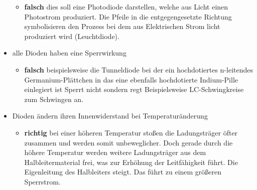 \begin{itemize}
        \begin{itemize}
            \item \textbf{falsch} dies soll eine Photodiode darstellen, welche
                aus Licht einen Photostrom produziert. 
                Die Pfeile in die entgegengesetzte Richtung symbolisieren den
                Prozess bei dem aus Elektrischen Strom licht produziert
                wird (Leuchtdiode).
        \end{itemize}
    \item alle Dioden haben eine Sperrwirkung
        \begin{itemize}
            \item \textbf{falsch} beispielsweise die Tunneldiode bei der ein
                hochdotiertes n-leitendes Germanium-Plättchen in das eine 
                ebenfalls hochdotierte Indium-Pille einlegiert ist Sperrt 
                nicht sondern regt Beispielsweise LC-Schwingkreise zum 
                Schwingen an.
        \end{itemize}
    \item Dioden ändern ihren Innenwiderstand bei Temperaturänderung
    \begin{itemize}
        \item \textbf{richtig} bei einer höheren Temperatur stoßen die 
            Ladungsträger öfter zusammen und werden somit unbeweglicher. 
            Doch gerade durch die höhere Temperatur werden weitere 
            Ladungsträger aus dem Halbleitermaterial frei, 
            was zur Erhöhung der Leitfähigkeit führt. 
            Die Eigenleitung des Halbleiters steigt. 
            Das führt zu einem größeren Sperrstrom.
    \end{itemize}
\end{itemize}
